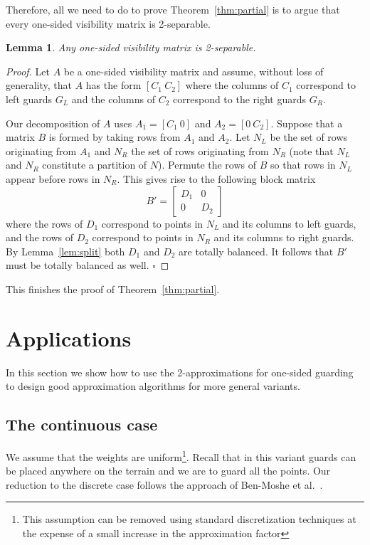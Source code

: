 \documentclass[11pt]{article}
\newcommand{\qed}{\hfill$\square$\bigskip}
\newtheorem{lemma}{Lemma}
\begin{document}
Therefore, all we need to do to prove Theorem~\ref{thm:partial} is to argue
that every one-sided visibility matrix is 2-separable.

\begin{lemma}
  Any one-sided visibility matrix is 2-separable.
\end{lemma}

\begin{proof}
  Let $A$ be a one-sided visibility matrix and assume, without loss of
  generality, that $A$ has the form $[C_1\ C_2]$ where the columns of $C_1$
  correspond to left guards $G_L$ and the columns of $C_2$ correspond to the right
  guards $G_R$.

  Our decomposition of $A$ uses $A_1 = [C_1\ 0]$ and $A_2 = [0\ C_2]$. Suppose
  that a matrix $B$ is formed by taking rows from $A_1$ and $A_2$. Let $N_L$
  be the set of rows originating from $A_1$ and $N_R$ the set of rows
  originating from $N_R$ (note that $N_L$ and $N_R$ constitute a partition
  of $N$). Permute the rows of $B$ so that rows in $N_L$ appear before rows
  in $N_R$. This gives rise to the following block matrix
  \[ B' = \left[ \begin{array}{cc} D_1 & 0 \\ 0 & D_2 \end{array} \right] \]
  where the rows of $D_1$ correspond to points in $N_L$ and its columns to
  left guards, and the rows of $D_2$ correspond to points in $N_R$ and its
  columns to right guards. By Lemma~\ref{lem:split} both $D_1$ and $D_2$ are
  totally balanced. It follows that $B'$ must be totally balanced as well. \qed
\end{proof}

This finishes the proof of Theorem~\ref{thm:partial}.

\section{Applications}
\label{sec:applications}

In this section we show how to use the 2-approximations for one-sided guarding
to design good approximation algorithms for more general variants.

\subsection{The continuous case}

We assume that the weights are uniform\footnote{This assumption can be removed
  using standard discretization techniques at the expense of a small increase
  in the approximation factor}.  Recall that in this variant guards can be
placed anywhere on the terrain and we are to guard all the points. Our
reduction to the discrete case follows the approach of Ben-Moshe et
al.~\cite{journals/siamcomp/Ben-MosheKM07}.
\end{document}
